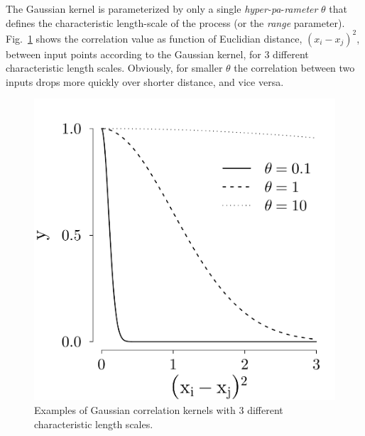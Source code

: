 The Gaussian kernel is parameterized by only a single \emph{hyper-pa}-\emph{rameter} $\theta$ that defines the characteristic length-scale of the process (or the \emph{range} parameter).
Fig.~\ref{fig:plot_corrfun_gauss} shows the correlation value as function of Euclidian distance, $(x_i - x_j)^2$, between input points according to the Gaussian kernel, 
for 3 different characteristic length scales.
Obviously, for smaller $\theta$ the correlation between two inputs drops more quickly over shorter distance, and vice versa.
\begin{figure}[bth]
	\centering
	\includegraphics[scale=0.35]{../figures/chapter4/figures/plotCorrFunGauss.pdf}
	\caption[Gaussian correlation kernels with 3 different characteristic length scales]{Examples of Gaussian correlation kernels with 3 different characteristic length scales.}
	\label{fig:plot_corrfun_gauss}
\end{figure}

